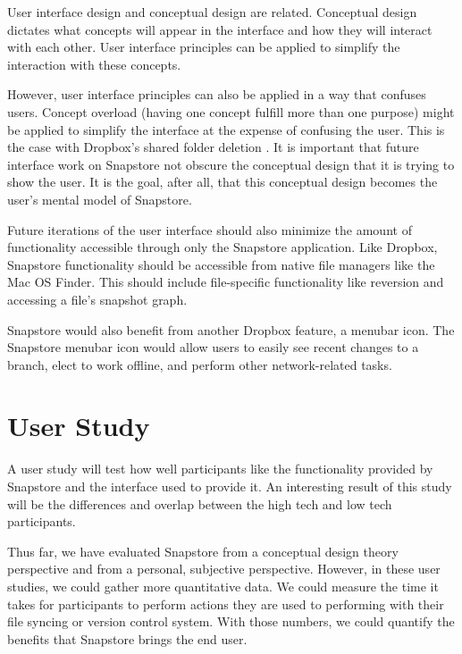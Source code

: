 User interface design and conceptual design are related. Conceptual design dictates what concepts will appear in the interface and how they will interact with each other. User interface principles can be applied to simplify the interaction with these concepts. 

However, user interface principles can also be applied in a way that confuses users. Concept overload (having one concept fulfill more than one purpose) might be applied to simplify the interface at the expense of confusing the user. This is the case with Dropbox's shared folder deletion \cite{Zhang}. It is important that future interface work on Snapstore not obscure the conceptual design that it is trying to show the user. It is the goal, after all, that this conceptual design becomes the user's mental model of Snapstore.

Future iterations of the user interface should also minimize the amount of functionality accessible through only the Snapstore application. Like Dropbox, Snapstore functionality should be accessible from native file managers like the Mac OS Finder. This should include file-specific functionality like reversion and accessing a file's snapshot graph.

Snapstore would also benefit from another Dropbox feature, a menubar icon. The Snapstore menubar icon would allow users to easily see recent changes to a branch, elect to work offline, and perform other network-related tasks.

\section{User Study}

A user study will test how well participants like the functionality provided by Snapstore and the interface used to provide it. An interesting result of this study will be the differences and overlap between the high tech and low tech participants.

Thus far, we have evaluated Snapstore from a conceptual design theory perspective and from a personal, subjective perspective. However, in these user studies, we could gather more quantitative data. We could measure the time it takes for participants to perform actions they are used to performing with their file syncing or version control system. With those numbers, we could quantify the benefits that Snapstore brings the end user.





